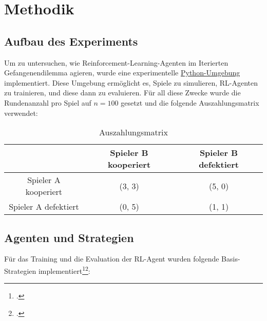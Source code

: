 \chapter{Methodik}
\section{Aufbau des Experiments}
Um zu untersuchen, wie Reinforcement-Learning-Agenten im Iterierten 
Gefangenendilemma agieren, wurde eine experimentelle 
\href{https://github.com/Jonah-gr/Reinforcement-Learning-IPD}{Python-Umgebung} implementiert. 
Diese Umgebung ermöglicht es, Spiele zu simulieren, RL-Agenten zu trainieren, und diese dann zu evaluieren.
Für all diese Zwecke wurde die Rundenanzahl pro Spiel auf $n=100$ gesetzt und die folgende Auszahlungsmatrix verwendet:

\begin{table}[h!]
    \centering
    \begin{tabular}{c|c|c}
            & Spieler B kooperiert & Spieler B defektiert\\
        \hline
        Spieler A kooperiert &  (3, 3) & (5, 0) \\
        \hline
        Spieler A defektiert &  (0, 5) & (1, 1) \\
    \end{tabular}
    \caption{Auszahlungsmatrix}
    \label{table:auszahlungsmatrix}
\end{table}

\section{Agenten und Strategien}
\label{3.2}
Für das Training und die Evaluation der RL-Agent wurden folgende Basis-Strategien implementiert\footcite{axelrod1984cooperation}\footcite{stewart2012extortion}:

